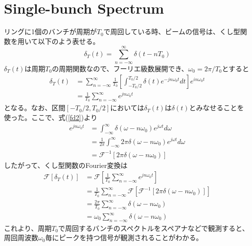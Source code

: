 \documentclass[]{jlreq}
\begin{document}
\section{Single-bunch Spectrum}
リングに1個のバンチが周期が$T_0$で周回している時、ビームの信号は、くし型関数を用いて以下のよう表せる。
%
\begin{equation}
  \delta_T (t) = \sum_{n=-\infty}^{\infty} \delta (t - n T_0 )
\end{equation}
%
$\delta_T (t)$は周期$T_0$の周期関数なので、フーリエ級数展開でき、$\omega_0 = 2\pi / T_0$とすると
%
\begin{align}
  \delta_T(t) &= \sum_{n = -\infty}^{\infty} \frac{1}{T_0} \left[\int_{-T_0/2}^{T_0/2}\delta (t) e^{-j n \omega_0 t} dt\right] 
  e^{i n \omega_0 t} \\
              &= \frac{1}{T_0} \sum_{n = -\infty}^{\infty} e^{j n \omega_0 t} 
\end{align}
%
となる。なお、区間$[-T_0/2, T_0/2]$においては$\delta_T(t)$は$\delta(t)$とみなせることを使った。ここで、式(\ref{fd2})より
%
\begin{align}
  e^{j n \omega_0 t} &=  \int_{-\infty}^{\infty} \delta (\omega - n \omega_0) e^{j \omega t} d\omega \\ 
      &= \frac{1}{2\pi} \int_{-\infty}^{\infty} 2\pi \delta (\omega - n \omega_0) e^{j \omega t} d\omega \\ 
      &= \mathcal{F}^{-1}[2\pi \delta(\omega - n\omega_0)] 
\end{align}
%
したがって、くし型関数のFourier変換は
%
\begin{align}
  \mathcal{F}[\delta_T(t)] &= \mathcal{F}\left[\frac{1}{T_0} \sum_{n = -\infty}^{\infty} e^{j n \omega_0 t}\right] \\ 
      & = \frac{1}{T_0} \sum_{n = -\infty}^{\infty} \mathcal{F}[\mathcal{F}^{-1}[2\pi \delta(\omega - n\omega_0)]] \\ 
      & = \frac{2 \pi}{T_0} \sum_{n = -\infty}^{\infty} \delta(\omega - n\omega_0)\\ 
      &= \omega_0 \sum_{n = -\infty}^{\infty} \delta(\omega - n\omega_0)
\end{align}
%
これより、周期$T_0$で周回するバンチのスペクトルをスペアナなどで観測すると、周回周波数$\omega_0$毎にピークを持つ信号が観測されることがわかる。
%
\end{document}
